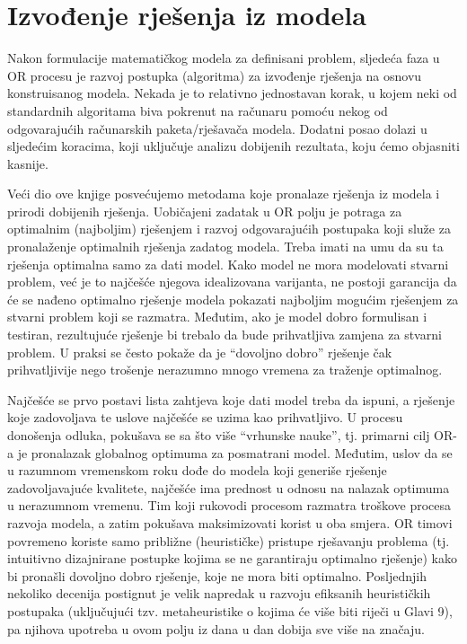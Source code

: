 \documentclass[a4paper, utf8, 11pt, colorlinks]{book}
\begin{document}
\section{Izvođenje rješenja iz modela}

Nakon formulacije matematičkog modela za definisani problem, sljedeća faza u OR procesu je razvoj postupka (algoritma) za
izvođenje rješenja na osnovu konstruisanog modela. Nekada je to relativno jednostavan korak, u kojem neki od standardnih algoritama biva pokrenut na računaru pomoću nekog od   odgovarajućih računarskih paketa/rješavača modela.
Dodatni posao dolazi u sljedećim koracima, koji uključuje 
analizu dobijenih rezultata, koju ćemo objasniti kasnije. 

Veći dio ove knjige posvećujemo metodama koje pronalaze rješenja iz modela i prirodi dobijenih  rješenja.  Uobičajeni zadatak u OR polju je potraga za optimalnim (najboljim) rješenjem i razvoj odgovarajućih postupaka koji služe za pronala\-ženje optimalnih rješenja zadatog modela. Treba imati na umu da su ta rješenja optimalna samo za dati model. Kako model ne mora modelovati stvarni problem, već je to najčešće njegova idealizovana varijanta, ne postoji garancija da će se nađeno optimalno rješenje modela pokazati najboljim mogućim rješenjem za stvarni problem koji se razmatra. Međutim, ako je
model dobro formulisan i testiran, rezultujuće rješenje  bi trebalo da bude prihvatljiva zamjena za stvarni problem. U praksi se često pokaže da je ``dovoljno dobro'' rješenje čak prihvatljivije nego trošenje nerazumno mnogo vremena za traženje optimalnog.

Najčešće se prvo postavi lista zahtjeva koje dati model treba da ispuni, a rješenje koje zadovoljava te uslove najčešće se   uzima kao prihvatljivo. U procesu donošenja odluka, pokušava se sa što više  ``vrhunske nauke'', tj. primarni cilj OR-a je pronalazak globalnog optimuma za posmatrani model. Međutim,  uslov da se u razumnom vremenskom roku dođe do modela koji generiše rješenje  zadovoljavajuće kvalitete, najčešće ima prednost u odnosu na nalazak optimuma u nerazumnom vremenu. Tim  koji rukovodi procesom  razmatra troškove procesa razvoja modela, a zatim
pokušava maksimizovati korist u oba smjera. OR timovi povremeno koriste samo približne (heurističke) pristupe rješavanju problema (tj. intuitivno dizajnirane postupke kojima se ne garantiraju optimalno rješenje) kako bi pronašli dovoljno dobro  rješenje, koje ne mora biti optimalno. Posljednjih nekoliko decenija postignut je velik napredak u razvoju efiksanih heurističkih postupaka (uključujući tzv. metaheuristike o kojima će više biti riječi u Glavi 9), pa njihova upotreba u ovom polju iz dana u dan  dobija sve više na značaju.  
\end{document}
